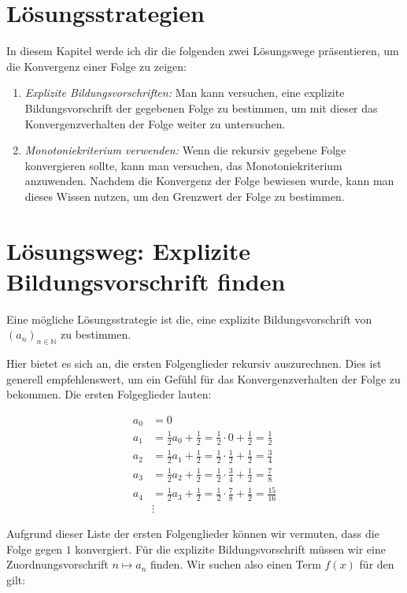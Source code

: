 \documentclass[fontsize=9pt,
               parskip=half-,
               DIV=14,
               listof=chapterentry,
               tocflat]{scrbook}
\begin{document}
\section{Lösungsstrategien}

In diesem Kapitel werde ich dir die folgenden zwei Lösungswege präsentieren, um die Konvergenz einer Folge zu zeigen:

\begin{enumerate}
\item \emph{Explizite Bildungsvorschriften:} Man kann versuchen, eine explizite Bildungsvorschrift der gegebenen Folge zu bestimmen, um mit dieser das Konvergenzverhalten der Folge weiter zu untersuchen.
\item \emph{Monotoniekriterium verwenden:} Wenn die rekursiv gegebene Folge konvergieren sollte, kann man versuchen, das Monotoniekriterium anzuwenden. Nachdem die Konvergenz der Folge bewiesen wurde, kann man dieses Wissen nutzen, um den Grenzwert der Folge zu bestimmen.
\end{enumerate}

\section{Lösungsweg: Explizite Bildungsvorschrift finden}

Eine mögliche Lösungsstrategie ist die, eine explizite Bildungsvorschrift von $(a_{n})_{n\in \mathbb {N} }$ zu bestimmen.

Hier bietet es sich an, die ersten Folgenglieder rekursiv auszurechnen. Dies ist generell empfehlenswert, um ein Gefühl für das Konvergenzverhalten der Folge zu bekommen. Die ersten Folgeglieder lauten:

\begin{align*}
a_{0}&=0\\[0.3em]a_{1}&={\frac {1}{2}}a_{0}+{\frac {1}{2}}={\frac {1}{2}}\cdot 0+{\frac {1}{2}}={\frac {1}{2}}\\[0.3em]a_{2}&={\frac {1}{2}}a_{1}+{\frac {1}{2}}={\frac {1}{2}}\cdot {\frac {1}{2}}+{\frac {1}{2}}={\frac {3}{4}}\\[0.3em]a_{3}&={\frac {1}{2}}a_{2}+{\frac {1}{2}}={\frac {1}{2}}\cdot {\frac {3}{4}}+{\frac {1}{2}}={\frac {7}{8}}\\[0.3em]a_{4}&={\frac {1}{2}}a_{3}+{\frac {1}{2}}={\frac {1}{2}}\cdot {\frac {7}{8}}+{\frac {1}{2}}={\frac {15}{16}}\\[0.3em]&\vdots 
\end{align*}

Aufgrund dieser Liste der ersten Folgenglieder können wir vermuten, dass die Folge gegen $1$ konvergiert. Für die explizite Bildungsvorschrift müssen wir eine Zuordnungsvorschrift $n\mapsto a_{n}$ finden. Wir suchen also einen Term $f(x)$ für den gilt:
\end{document}
